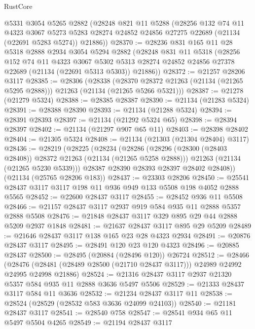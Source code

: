\begin{lexlean}{RustCore}
\begin{coremodule}
    @5331
    @3054
    @5265
    @2882
    (@28248
      @821
      @11
      @5288
      (@28256
        @132
        @74
        @11
        @4323
        @3067
        @5273
        @5283
        @28274
        @24852
        @24856
        @27275
        @22689
        (@21134 (@22691 @5283 @5274))
        @21886))
@28370 := @28236
    @831
    @165
    @11
    @28
    @5318
    @2888
    @2934
    @3054
    @5294
    @2882
    (@28248
      @831
      @11
      @5318
      (@28256
        @152
        @74
        @11
        @4323
        @3067
        @5302
        @5313
        @28274
        @24852
        @24856
        @27378
        @22689
        (@21134 (@22691 @5313 @5303))
        @21886))
@28372 := @21257 @28206 @3117
@28385 := @28306
    (@28338
      (@28370 @28372 @21263 (@21134 (@21265 @5295 @2888)))
      @21263
      (@21134 (@21265 @5266 @5321)))
@28387 := @21278 (@21279 @5324)
@28388 := @28385 @28387
@28390 := @21134 (@21283 @5324)
@28391 := @28388 @28390
@28393 := @21134 (@21288 @5324)
@28394 := @28391 @28393
@28397 := @21134 (@21292 @5324 @65)
@28398 := @28394 @28397
@28402 := @21134 (@21297 @907 @65 @11)
@28403 := @28398 @28402
@28404 := @21305 @5324
@28408 := @21134 (@21303 (@21304 @28404) @3117)
@28436 := @28219
    (@28225
      (@28234
        (@28286
          (@28296 (@28300 (@28403 @28408)) @28372 @21263 (@21134 (@21265 @5258 @2888)))
          @21263
          (@21134 (@21265 @5230 @5339)))
        @28387
        @28390
        @28393
        @28397
        @28402
        @28408))
    (@21134 (@25765 @28206 @183))
@28437 := @23303 @28206
@28450 := @25541 @28437 @3117 @3117 @198 @11 @936 @949 @133 @5508 @198 @4052 @2888 @5565
@28452 := @22600 @28437 @3117
@28455 := @28452 @936 @11 @5508
@28466 := @21157 @28437 @3117 @2937 @919 @584 @935 @11 @2888 @5357 @2888 @5508
@28476 := @21848 @28437 @3117 @329 @895 @29 @44 @2888 @5209 @2937 @1848
@28481 := @21637 @28437 @3117 @895 @29 @5209
@28489 := @21646 @28437 @3117 @138 @165 @23 @28 @4323 @2934
@28491 := @20876 @28437 @3117
@28495 := @28491 @120 @23 @120 @4323
@28496 := @20885 @28437
@28500 := @28495 (@20884 (@28496 @120)) @26724
@28512 := @28466
    (@28476 (@28481 (@28489 @28500 (@21710 @28437 @3117))) @24989 @24992 @24995 @24998 @21886)
@28524 := @21316 @28437 @3117 @2937 @21320 @5357 @584 @935 @11 @2888 @3636 @5497 @5506
@28529 := @21333 @28437 @3117 @584 @11 @3636
@28532 := @21234 @28437 @3117 @11
@28538 := @28524 (@28529 (@28532 @583 @3636 @24099 @24103))
@28540 := @21181 @28437 @3117
@28541 := @28540 @758
@28547 := @28541 @934 @65 @11 @5497 @5504 @4265
@28549 := @21194 @28437 @3117

\end{coremodule}
\end{lexlean}
